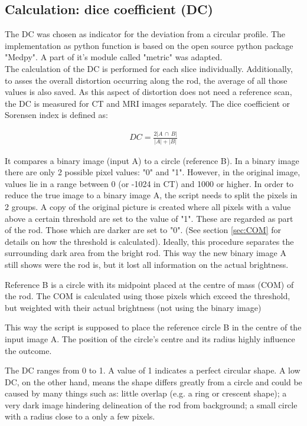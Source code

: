 \subsection{Calculation: dice coefficient (DC)}
\label{sec:DC}

The DC was chosen as indicator for the deviation from a circular profile.
The implementation as python function is based on the open source python package "Medpy". \cite{MedPy} A part of it's module called "metric" was adapted. \cite{MedPy_dc-code}\\


The calculation of the DC is performed for each slice individually.
Additionally, to asses the overall distortion occurring along the rod, the average of all those values is also saved.
As this aspect of distortion does not need a reference scan, the DC is measured for CT and MRI images separately.
The dice coefficient or Sorensen index \cite{MedPy_dc-doc} is defined as:

\begin{align}
DC = \frac{2 |A \, \cap \, B|}{|A| + |B|}
\end{align}

It compares a binary image (input A) to a circle (reference B).
In a binary image there are only 2 possible pixel values: "0" and "1".
However, in the original image, values lie in a range between 0 (or -1024 in CT) and 1000 or higher.
In order to reduce the true image to a binary image A, the script needs to split the pixels in 2 groups.
A copy of the original picture is created where all pixels with a value above a certain threshold are set to the value of "1".
These are regarded as part of the rod.
Those which are darker are set to "0".
(See section \ref{sec:COM} for details on how the threshold is calculated).
Ideally, this procedure separates the surrounding dark area from the bright rod.
This way the new binary image A still shows were the rod is, but it lost all information on the actual brightness.

Reference B is a circle with its midpoint placed at the centre of mass (COM) of the rod.
The COM is calculated using those pixels which exceed the threshold, but weighted with their actual brightness (not using the binary image)

This way the script is supposed to place the reference circle B in the centre of the input image A.
The position of the circle's centre and its radius highly influence the outcome.

The DC ranges from 0 to 1.
A value of 1 indicates a perfect circular shape.
A low DC, on the other hand, means the shape differs greatly from a circle and could be caused by many things such as:
little overlap (e.g. a ring or crescent shape); a very dark image hindering delineation of the rod from background; a small circle with a radius close to a only a few pixels.

